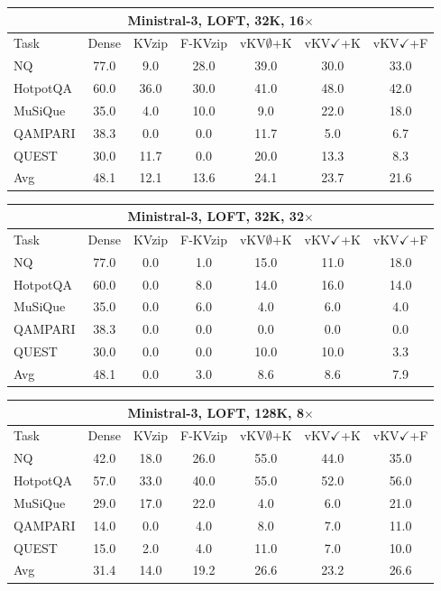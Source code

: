 \begin{tabular}{lcccccc}
\toprule
\multicolumn{7}{c}{Ministral-3, LOFT, 32K, 16$\times$} \\
\midrule
Task & Dense & KVzip & F-KVzip & vKV$\emptyset$+K & vKV$\checkmark$+K & vKV$\checkmark$+F \\
\midrule
NQ & 77.0 & 9.0 & 28.0 & 39.0 & 30.0 & 33.0 \\
HotpotQA & 60.0 & 36.0 & 30.0 & 41.0 & 48.0 & 42.0 \\
MuSiQue & 35.0 & 4.0 & 10.0 & 9.0 & 22.0 & 18.0 \\
QAMPARI & 38.3 & 0.0 & 0.0 & 11.7 & 5.0 & 6.7 \\
QUEST & 30.0 & 11.7 & 0.0 & 20.0 & 13.3 & 8.3 \\
\midrule
Avg & 48.1 & 12.1 & 13.6 & 24.1 & 23.7 & 21.6 \\
\bottomrule
\end{tabular}
\vspace{0.8em}

\begin{tabular}{lcccccc}
\toprule
\multicolumn{7}{c}{Ministral-3, LOFT, 32K, 32$\times$} \\
\midrule
Task & Dense & KVzip & F-KVzip & vKV$\emptyset$+K & vKV$\checkmark$+K & vKV$\checkmark$+F \\
\midrule
NQ & 77.0 & 0.0 & 1.0 & 15.0 & 11.0 & 18.0 \\
HotpotQA & 60.0 & 0.0 & 8.0 & 14.0 & 16.0 & 14.0 \\
MuSiQue & 35.0 & 0.0 & 6.0 & 4.0 & 6.0 & 4.0 \\
QAMPARI & 38.3 & 0.0 & 0.0 & 0.0 & 0.0 & 0.0 \\
QUEST & 30.0 & 0.0 & 0.0 & 10.0 & 10.0 & 3.3 \\
\midrule
Avg & 48.1 & 0.0 & 3.0 & 8.6 & 8.6 & 7.9 \\
\bottomrule
\end{tabular}
\vspace{0.8em}

\begin{tabular}{lcccccc}
\toprule
\multicolumn{7}{c}{Ministral-3, LOFT, 128K, 8$\times$} \\
\midrule
Task & Dense & KVzip & F-KVzip & vKV$\emptyset$+K & vKV$\checkmark$+K & vKV$\checkmark$+F \\
\midrule
NQ & 42.0 & 18.0 & 26.0 & 55.0 & 44.0 & 35.0 \\
HotpotQA & 57.0 & 33.0 & 40.0 & 55.0 & 52.0 & 56.0 \\
MuSiQue & 29.0 & 17.0 & 22.0 & 4.0 & 6.0 & 21.0 \\
QAMPARI & 14.0 & 0.0 & 4.0 & 8.0 & 7.0 & 11.0 \\
QUEST & 15.0 & 2.0 & 4.0 & 11.0 & 7.0 & 10.0 \\
\midrule
Avg & 31.4 & 14.0 & 19.2 & 26.6 & 23.2 & 26.6 \\
\bottomrule
\end{tabular}
\vspace{0.8em}

